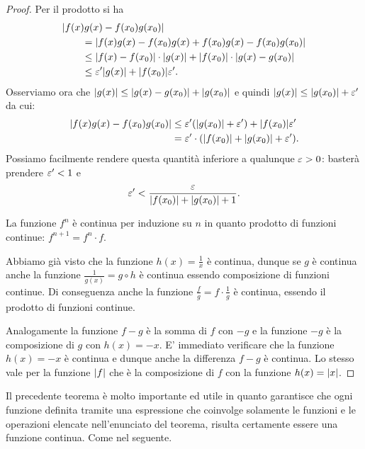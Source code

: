 \begin{proof}
Per il prodotto si ha
\begin{align*}
  \MoveEqLeft \abs{f(x)g(x)-f(x_0)g(x_0)}\\
  &= \abs{f(x)g(x) - f(x_0)g(x) + f(x_0)g(x) - f(x_0)g(x_0)}\\
  &\le \abs{f(x)-f(x_0)}\cdot\abs{g(x)} + \abs{f(x_0)}\cdot \abs{g(x)-g(x_0)} \\
  &\le \eps' \abs{g(x)} + \abs{f(x_0)} \eps'.
\end{align*}
Osserviamo ora che ${\left|g(x)\right|}\le {\left|g(x)-g(x_0)\right|} + {\left|g(x_0)\right|}$
e quindi ${\left|g(x)\right|}\le {\left|g(x_0)\right|}+\varepsilon'$ da cui:
\begin{align*}
  {\left|f(x)g(x)-f(x_0)g(x_0)\right|}
  &\le \varepsilon' {\left( {\left|g(x_0)\right|}+\varepsilon' \right)} + {\left|f(x_0)\right|} \varepsilon' \\
  &= \varepsilon' \cdot({\left|f(x_0)\right|} + {\left|g(x_0)\right|} + \varepsilon').
\end{align*}
Possiamo facilmente rendere questa quantità inferiore a
qualunque $\varepsilon>0$: basterà prendere $\varepsilon'<1$ e
\[
  \varepsilon' < \frac{\varepsilon}{{\left|f(x_0)\right|} + {\left|g(x_0)\right|} + 1}.
\]

La funzione $f^n$ è continua per induzione su $n$
in quanto prodotto di funzioni
continue: $f^{n+1} = f^{n} \cdot f$.

Abbiamo già visto che la funzione $h(x) = \frac{1}{x}$ è continua,
dunque se $g$ è continua anche la funzione $\frac{1}{g(x)} = g\circ h$
è continua essendo composizione di funzioni continue. Di conseguenza anche la funzione $\frac{f}{g} = f \cdot \frac{1}{g}$
è continua, essendo il prodotto di funzioni continue.

Analogamente la funzione $f-g$ è la somma di $f$ con $-g$ e
la funzione $-g$ è la composizione di $g$ con $h(x)=-x$.
E' immediato verificare che la funzione $h(x)=-x$ è continua
e dunque anche la differenza $f-g$ è continua.
Lo stesso vale per la funzione ${\left|f\right|}$ che è la composizione
di $f$ con la funzione $h(x) = {\left|x\right|}$.
\end{proof}

Il precedente teorema è molto importante ed utile in quanto
garantisce che ogni funzione definita tramite una espressione
che coinvolge solamente le funzioni e le operazioni
elencate nell'enunciato del teorema, risulta certamente
essere una funzione continua. Come nel seguente.

